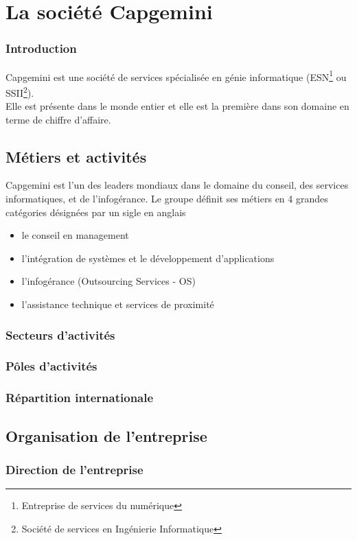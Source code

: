 \chapter{La société Capgemini}
\subsection*{Introduction}
Capgemini est une société de services spécialisée en génie informatique (ESN\footnote{Entreprise de services du numérique} ou SSII\footnote{Société de services en Ingénierie Informatique}).
\\Elle est présente dans le monde entier et elle est la première dans son domaine en terme de chiffre d'affaire.
\newpage
\section{Métiers et activités}
Capgemini est l'un des leaders mondiaux dans le domaine du conseil, des services informatiques, et de l'infogérance.
Le groupe définit ses métiers en 4 grandes catégories désignées par un sigle en anglais
\\
\begin{itemize}
\item le conseil en management
\item l'intégration de systèmes et le développement d'applications
\item l’infogérance (Outsourcing Services - OS)
\item l'assistance technique et services de proximité
\end{itemize}
\subsection{Secteurs d'activités}
\subsection{Pôles d'activités}
\subsection{Répartition internationale}
\section{Organisation de l'entreprise}
\subsection{Direction de l'entreprise}
